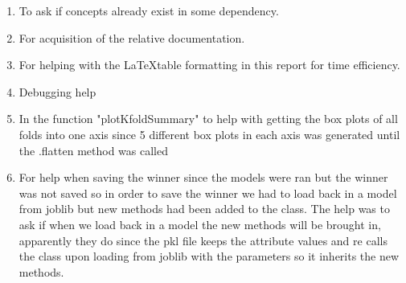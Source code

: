 \documentclass[12pt, a4paper]{article}
\begin{document}
\begin{multicols}{2}
    \begin{enumerate} \label{enm:llm}
        \item To ask if concepts already exist in some dependency.
        \item For acquisition of the relative documentation.
        \item For helping with the \LaTeX table formatting in this report for time efficiency.
        \item Debugging help
        \item In the function "plotKfoldSummary" to help with getting the box plots of all folds into one axis since 5 different box plots in each axis was generated until the .flatten method was called
        \item For help when saving the winner since the models were ran but the winner was not saved so in order to save the winner we had to load back in a model from joblib but new methods had been added to the class. The help was to ask if when we load back in a model the new methods will be brought in, apparently they do since the pkl file keeps the attribute values and re calls the class upon loading from joblib with the parameters so it inherits the new methods.
    \end{enumerate}

    \printbibliography

\end{multicols}
\end{document}
